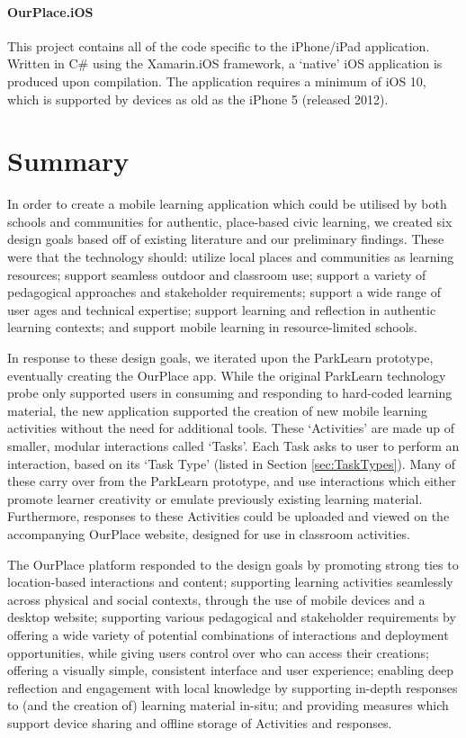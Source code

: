 \paragraph{OurPlace.iOS}
This project contains all of the code specific to the iPhone/iPad application. Written in C\# using the Xamarin.iOS framework, a `native' iOS application is produced upon compilation. The application requires a minimum of iOS 10, which is supported by devices as old as the iPhone 5 (released 2012).

\section{Summary}
In order to create a mobile learning application which could be utilised by both schools and communities for authentic, place-based civic learning, we created six design goals based off of existing literature and our preliminary findings. These were that the technology should: utilize local places and communities as learning resources; support seamless outdoor and classroom use; support a variety of pedagogical approaches and stakeholder requirements; support a wide range of user ages and technical expertise; support learning and reflection in authentic learning contexts; and support mobile learning in resource-limited schools.

In response to these design goals, we iterated upon the ParkLearn prototype, eventually creating the OurPlace app. While the original ParkLearn technology probe only supported users in consuming and responding to hard-coded learning material, the new application supported the creation of new mobile learning activities without the need for additional tools. These `Activities' are made up of smaller, modular interactions called `Tasks'. Each Task asks to user to perform an interaction, based on its `Task Type' (listed in Section \ref{sec:TaskTypes}). Many of these carry over from the ParkLearn prototype, and use interactions which either promote learner creativity or emulate previously existing learning material. Furthermore, responses to these Activities could be uploaded and viewed on the accompanying OurPlace website, designed for use in classroom activities. 

The OurPlace platform responded to the design goals by promoting strong ties to location-based interactions and content; supporting learning activities seamlessly across physical and social contexts, through the use of mobile devices and a desktop website; supporting various pedagogical and stakeholder requirements by offering a wide variety of potential combinations of interactions and deployment opportunities, while giving users control over who can access their creations; offering a visually simple, consistent interface and user experience; enabling deep reflection and engagement with local knowledge by supporting in-depth responses to (and the creation of) learning material in-situ; and providing measures which support device sharing and offline storage of Activities and responses.